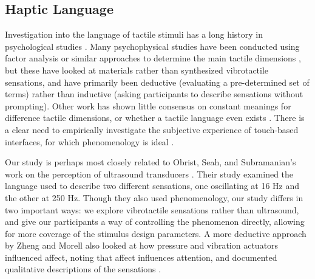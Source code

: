 \subsection{Haptic Language}
Investigation into the language of tactile stimuli has a long history in psychological studies \cite{Okamoto2013}.
Many psychophysical studies have been conducted using factor analysis or similar approaches to determine the main tactile dimensions  \cite{Okamoto2013}, but these have looked at materials rather than synthesized vibrotactile sensations, 
%
and have primarily been deductive (evaluating a pre-determined set of terms) rather than inductive (asking participants to describe sensations without prompting).
Other work has shown little consensus on constant meanings for difference tactile dimensions, or whether a tactile language even exists \cite{Jansson-Boyd2011}.
There is a clear need to empirically investigate the subjective experience of touch-based interfaces, for which phenomenology is ideal \cite{Creswell2013, Moustakas1994}.


Our study is perhaps most closely related to Obrist, Seah, and Subramanian's work on the perception of ultrasound transducers \cite{Obrist2013}.
Their study examined the language used to describe two different sensations, one oscillating at 16 Hz and the other at 250 Hz.
Though they also used phenomenology, our study differs in two important ways: we explore vibrotactile sensations rather than ultrasound, and give our participants a way of controlling the phenomenon directly, allowing for more coverage of the stimulus design parameters.
A more deductive approach by Zheng and Morell also looked at how pressure and vibration actuators influenced affect, noting that affect influences attention, and documented qualitative descriptions of the sensations \cite{Zheng2012}.




